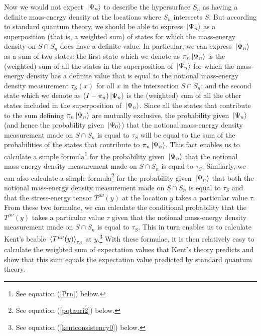 Now we would not expect $\ket*{\Psi_n}$ to describe the hypersurface $S_n$ as having a definite mass-energy density at the locations where $S_n$ intersects $S$. But according to standard quantum theory, we should be able to express $\ket*{\Psi_n}$ as a superposition (that is, a weighted sum) of states for which the mass-energy density on $S\cap S_n$ does have a definite value. In particular, we can express $\ket*{\Psi_n}$ as a sum of two states: the first state which we denote as $\pi_n \ket*{\Psi_n}$ \label{overviewpi}
is the (weighted) sum of all the states in the superposition of $\ket*{\Psi_n}$ for which the mass-energy density has a definite value that is equal to the notional mass-energy density measurement $\tau_S(x)$ for all $x$ in the intersection $S\cap S_n$; and the second state which we denote as $(I- \pi_n) \ket*{\Psi_n}$ is the (weighted) sum of all the other states included in the superposition of $\ket*{\Psi_n}$. Since all the states that contribute to the sum defining $\pi_n \ket*{\Psi_n}$ are mutually exclusive, the probability given $\ket*{\Psi_n}$ (and hence  the probability given $\ket*{\Psi_0}$) that the notional mass-energy density measurement made on $S\cap S_n$ is equal to $\tau_S$ will be equal to the sum of the probabilities of the states that contribute to $\pi_n \ket*{\Psi_n}$. This fact enables us to calculate a simple formula\footnote{See equation (\ref{Prn}) below.} for the probability given $\ket*{\Psi_n}$ that the notional mass-energy density measurement made on $S\cap S_n$ is equal to $\tau_S$. Similarly, we can also calculate a simple formula\footnote{See equation (\ref{pqtauri2}) below.} for the probability given $\ket*{\Psi_n}$ that both the notional mass-energy density measurement made on $S\cap S_n$ is equal to $\tau_S$ and that the stress-energy tensor $T^{\mu\nu}(y)$ at the location $y$ takes a particular value $\tau$. %
%
 From these two formulae, we can calculate the conditional probability that the $T^{\mu\nu}(y)$ takes a particular value $\tau$ given that the notional mass-energy density measurement made on $S\cap S_n$ is equal to $\tau_S$. This in turn enables us to calculate Kent's beable $\ev*{T^{\mu\nu}(y)}_{\tau_S}$ at $y$.\footnote{See equation (\ref{kentconsistency0}) below.} With these formulae, it is then relatively easy to calculate the weighted sum of expectation values that Kent's theory predicts and show that this sum equals the expectation value predicted by standard quantum theory.


